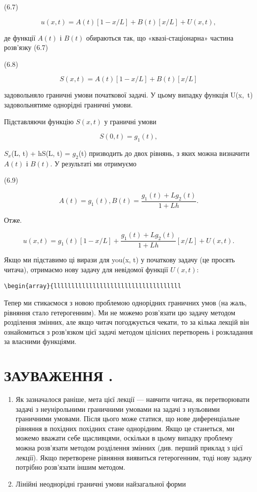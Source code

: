 \documentclass[
  ukrainian,
]{article}
\begin{document}
(6.7)

\[
u(x, t) = A(t)[1-x/L] + B(t)[x/L] + U(x, t),
\]

де функції \(A\left(t\right)\) і \(B\left(t\right)\) обираються так, що
«квазі-стаціонарна» частина розв'язку (6.7)

(6.8)

\[
S(x, t) = A(t)[1 - x/L] + B(t)[x/L]
\]

задовольняло граничні умови початкової задачі. У цьому випадку функція
U\left(x,~t\right) задовольнятиме однорідні граничні умови.

Підставляючи функцію \(S(x, t)\) у граничні умови

\[
S(0, t) = g_1(t),
\]

\(S_x\)(L, t) + hS(L, t) = \(g_2\)(t) призводить до двох рівнянь, з яких
можна визначити \(A(t)\) і \(B(t)\). У результаті ми отримуємо

(6.9)

\[
A(t) = g_1(t), B(t) = \frac{g_1(t) + Lg_2(t)}{1 + Lh}.
\]

Отже.

\[
u(x, t) = g_1(t) [1 - x/L] + \frac{g_1(t) + Lg_2(t)}{1 + Lh} [x/L] + U(x, t).
\]

Якщо ми підставимо ці вирази для you(x, t) у початкову задачу (це
просять читача), отримаємо нову задачу для невідомої функції
\(U(x, t)\):

\begin{verbatim}
\begin{array}{llllllllllllllllllllllllllllllllllll
\end{verbatim}

Тепер ми стикаємося з новою проблемою однорідних граничних умов (на
жаль, рівняння стало гетерогенним). Ми не можемо розв'язати цю задачу
методом розділення змінних, але якщо читач погоджується чекати, то за
кілька лекцій він ознайомиться з розв'язком цієї задачі методом цілісних
перетворень і розкладання за власними функціями.

\section{ЗАУВАЖЕННЯ
.}\label{ux437ux430ux443ux432ux430ux436ux435ux43dux43dux44f-.}

\begin{enumerate}
\def\labelenumi{\arabic{enumi}.}
\item
  Як зазначалося раніше, мета цієї лекції --- навчити читача, як
  перетворювати задачі з неунірольними граничними умовами на задачі з
  нульовими граничними умовами. Після цього може статися, що нове
  диференціальне рівняння в похідних похідних стане однорідним. Якщо це
  станеться, ми можемо вважати себе щасливцями, оскільки в цьому випадку
  проблему можна розв'язати методом розділення змінних (див. перший
  приклад з цієї лекції). Якщо перетворене рівняння виявиться
  гетерогенним, тоді нову задачу потрібно розв'язати іншим методом.
\item
  Лінійні неоднорідні граничні умови найзагальної форми
\end{enumerate}
\end{document}
